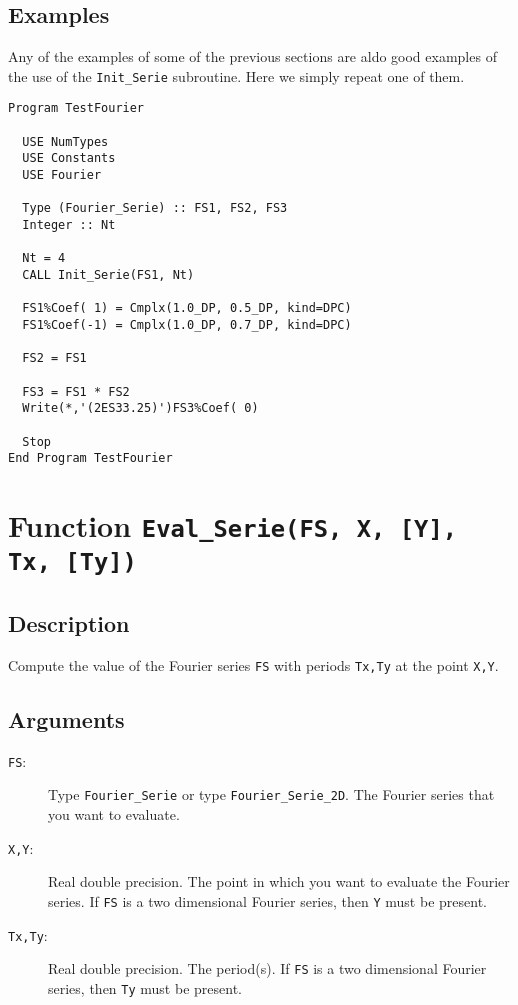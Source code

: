 \subsection{Examples}

Any of the examples of some of the previous sections are aldo good
examples of the use of the \texttt{Init\_Serie} subroutine. Here we
simply repeat one of them.

\begin{lstlisting}[emph=Init_Serie,
                   emphstyle=\color{blue},
                   frame=trBL,
                   caption=Initialising a Fourier series.,
                   label=init_serie]
Program TestFourier

  USE NumTypes
  USE Constants
  USE Fourier

  Type (Fourier_Serie) :: FS1, FS2, FS3
  Integer :: Nt

  Nt = 4
  CALL Init_Serie(FS1, Nt)

  FS1%Coef( 1) = Cmplx(1.0_DP, 0.5_DP, kind=DPC)
  FS1%Coef(-1) = Cmplx(1.0_DP, 0.7_DP, kind=DPC)
  
  FS2 = FS1  

  FS3 = FS1 * FS2
  Write(*,'(2ES33.25)')FS3%Coef( 0)

  Stop
End Program TestFourier
\end{lstlisting}

\section{Function \texttt{Eval\_Serie(FS, X, [Y], Tx, [Ty]) }}

\subsection{Description}

Compute the value of the Fourier series \texttt{FS} with periods
\texttt{Tx,Ty} at the point \texttt{X,Y}. 

\subsection{Arguments}

\begin{description}
\item[\texttt{FS}:] Type \texttt{Fourier\_Serie} or type
  \texttt{Fourier\_Serie\_2D}. The Fourier series that you want to evaluate.
\item[\texttt{X,Y}:] Real double precision. The point in which you
  want to evaluate the Fourier series. If \texttt{FS} is a two
  dimensional Fourier series, then \texttt{Y} must be present.
\item[\texttt{Tx,Ty}:] Real double precision. The period(s). If
  \texttt{FS} is a two dimensional Fourier series, then \texttt{Ty}
  must be present. 
\end{description}

